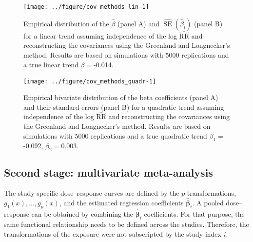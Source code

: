 \documentclass[11pt,a4paper,twoside,openany]{book}\usepackage{knitr}
\DeclareMathOperator{\SE}{SE}
\begin{document}
{{\begin{knitrout}\footnotesize
{}\color{fgcolor}\begin{figure}[ht!]

{\centering \texttt{[image: ../figure/cov\_methods\_lin-1]} 

}

\caption[Empirical distribution of the $\hat \beta$ (panel A) and $\widehat{\SE} \left( \hat \beta_i \right)$ (panel B) for a linear trend assuming independence of the log $\widehat{\mathrm{RR}}$  and reconstructing the covariances using the Greenland and Longnecker’s method]{Empirical distribution of the $\hat \beta$ (panel A) and $\widehat{\SE} \left( \hat \beta_i \right)$ (panel B) for a linear trend assuming independence of the log $\widehat{\mathrm{RR}}$  and reconstructing the covariances using the Greenland and Longnecker’s method. Results are based on simulations with 5000 replications and a true linear trend $\beta = $-0.014.}\label{fig:cov_methods_lin}
\end{figure}


\end{knitrout}

\begin{knitrout}\footnotesize
{}\color{fgcolor}\begin{figure}[ht!]

{\centering \texttt{[image: ../figure/cov\_methods\_quadr-1]} 

}

\caption{Empirical bivariate distribution of the beta coefficients (panel A) and their standard errors (panel B) for a quadratic trend assuming independence of the log $\widehat{\mathrm{RR}}$  and reconstructing the covariances using the Greenland and Longnecker’s method. Results are based on simulations with 5000 replications and a true quadratic trend $\beta_{1} = $-0.092, $\beta_{2} = $0.003.}\label{fig:cov_methods_quadr}
\end{figure}


\end{knitrout}


\subsection{Second stage: multivariate meta-analysis}\label{sec:2nd_stage}

The study-specific dose--response curves are defined by the $p$ transformations, $g_1(x), \dots, g_p(x)$, and the estimated regression coefficients $\boldsymbol{\hat \beta}_i$. A pooled dose--response can be obtained by combining the $\boldsymbol{\hat \beta}_i$ coefficients. For that purpose, the same functional relationship needs to be defined across the studies. Therefore, the transformations of the exposure were not subscripted by the study index $i$.

}}
\end{document}
